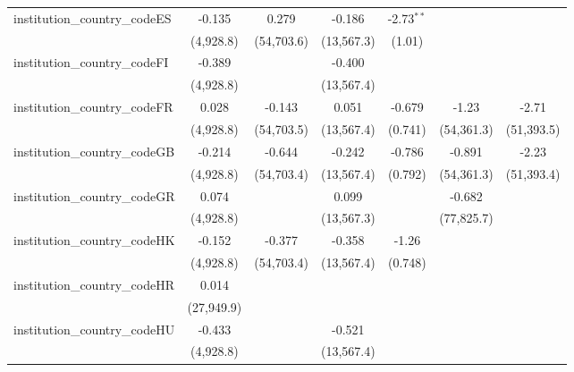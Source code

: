 \begin{tabular}{lcccccc}
   institution\_country\_codeES          & -0.135        & 0.279       & -0.186        & -2.73$^{**}$ &              &   \\   
                                         & (4,928.8)     & (54,703.6)  & (13,567.3)    & (1.01)       &              &   \\   
   institution\_country\_codeFI          & -0.389        &             & -0.400        &              &              &   \\   
                                         & (4,928.8)     &             & (13,567.4)    &              &              &   \\   
   institution\_country\_codeFR          & 0.028         & -0.143      & 0.051         & -0.679       & -1.23        & -2.71\\   
                                         & (4,928.8)     & (54,703.5)  & (13,567.4)    & (0.741)      & (54,361.3)   & (51,393.5)\\   
   institution\_country\_codeGB          & -0.214        & -0.644      & -0.242        & -0.786       & -0.891       & -2.23\\   
                                         & (4,928.8)     & (54,703.4)  & (13,567.4)    & (0.792)      & (54,361.3)   & (51,393.4)\\   
   institution\_country\_codeGR          & 0.074         &             & 0.099         &              & -0.682       &   \\   
                                         & (4,928.8)     &             & (13,567.3)    &              & (77,825.7)   &   \\   
   institution\_country\_codeHK          & -0.152        & -0.377      & -0.358        & -1.26        &              &   \\   
                                         & (4,928.8)     & (54,703.4)  & (13,567.4)    & (0.748)      &              &   \\   
   institution\_country\_codeHR          & 0.014         &             &               &              &              &   \\   
                                         & (27,949.9)    &             &               &              &              &   \\   
   institution\_country\_codeHU          & -0.433        &             & -0.521        &              &              &   \\   
                                         & (4,928.8)     &             & (13,567.4)    &              &              &   \\   

\end{tabular}
